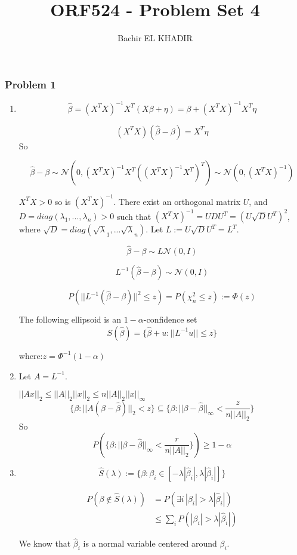 \documentclass[12pt]{article}
\title{ORF524 - Problem Set 4}
\author{Bachir EL KHADIR }
\newcommand{\Q}[1]{\subsubsection*{Problem #1}}
\begin{document}
\maketitle

\Q{1}
\begin{enumerate}
\item 
$$\hat \beta = (X^TX)^{-1}X^T(X\beta + \eta) = \beta + (X^TX)^{-1}X^T\eta$$

$$ (X^TX)(\hat \beta - \beta) = X^T \eta$$
So

$$\hat \beta - \beta \sim \mathcal N(0, (X^TX)^{-1}X^T ((X^TX)^{-1}X^T)^T) \sim \mathcal N(0, (X^TX)^{-1})$$


$X^TX > 0$ so is $(X^TX)^{-1}$. There exist an orthogonal matrix $U$, and $D = diag(\lambda_1,...,\lambda_n) > 0$ such that $(X^TX)^{-1} = UDU^T = (U \sqrt D U^T)^2$, where $\sqrt D = diag(\sqrt \lambda_1, ... \sqrt \lambda_n)$. Let $L := U \sqrt D U^T = L^T$.


$$\hat \beta - \beta \sim L \mathcal  N(0, I)$$

$$L^{-1}(\hat \beta - \beta) \sim \mathcal  N(0, I)$$

$$P(||L^{-1}(\hat \beta - \beta)||^2 \leq z ) = P(\chi_n^2 \leq z ) := \Phi(z)$$ 


The following ellipsoid is an $1-\alpha$-confidence set
$$S(\hat \beta) = \{ \hat \beta + u : ||L^{-1}u|| \leq z \}$$

where:$ z = \Phi^{-1}(1 - \alpha)$

\item 
Let $A = L^{-1}$.


$||Ax||_2 \le ||A||_2 ||x||_2 \le n ||A||_2 ||x||_{\infty}$
$$\{\beta: ||A(\beta - \hat \beta)||_2 < z \}  \subseteq
\{\beta: ||\beta - \hat \beta||_{\infty} 
< \frac z {n||A||_2} \}$$
So $$P(\{\beta: ||\beta - \hat \beta||_{\infty} 
< \frac r {n||A||_2} \}) \ge 1 - \alpha$$

\item 

$$\hat S(\lambda) := \{ \beta: \beta_i \in [-\lambda |\hat \beta_i| , \lambda |\hat \beta_i|] \}$$


\begin{align}
P(\beta \not \in\hat S(\lambda)) &=
P( \exists i\, |\beta_i| > \lambda |\hat \beta_i|)
\\&\le \sum_i P(|\beta_i| > \lambda |\hat \beta_i|)
\end{align}

We know that $\hat \beta_i$ is a normal variable centered around $\beta_i$.


\end{enumerate}
\end{document}
